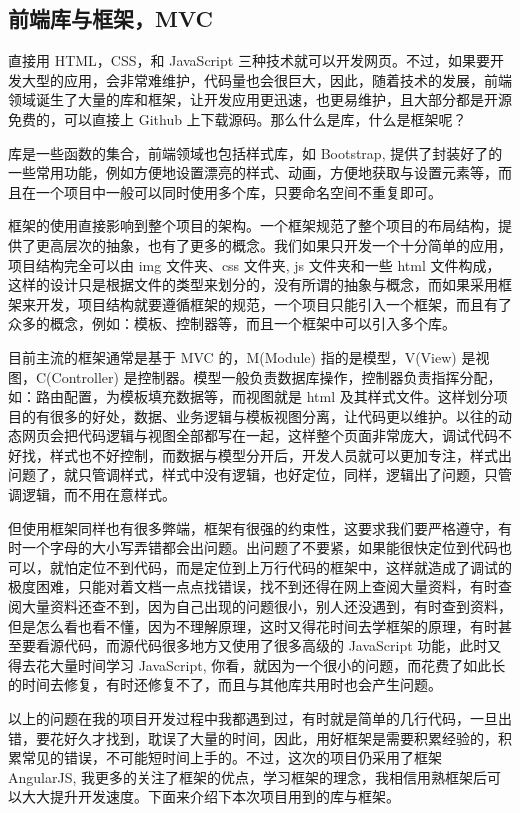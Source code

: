         \subsection{前端库与框架，MVC}
          \label{subsec:前端库与框架}
            直接用 HTML，CSS，和 JavaScript 三种技术就可以开发网页。不过，如果要开发大型的应用，会非常难维护，代码量也会很巨大，因此，随着技术的发展，前端领域诞生了大量的库和框架，让开发应用更迅速，也更易维护，且大部分都是开源免费的，可以直接上 Github 上下载源码。那么什么是库，什么是框架呢？
            \par
            库是一些函数的集合，前端领域也包括样式库，如 Bootstrap, 提供了封装好了的一些常用功能，例如方便地设置漂亮的样式、动画，方便地获取与设置元素等，而且在一个项目中一般可以同时使用多个库，只要命名空间不重复即可。
            \par
            框架的使用直接影响到整个项目的架构。一个框架规范了整个项目的布局结构，提供了更高层次的抽象，也有了更多的概念。我们如果只开发一个十分简单的应用，项目结构完全可以由 img 文件夹、css 文件夹, js 文件夹和一些 html 文件构成，这样的设计只是根据文件的类型来划分的，没有所谓的抽象与概念，而如果采用框架来开发，项目结构就要遵循框架的规范，一个项目只能引入一个框架，而且有了众多的概念，例如：模板、控制器等，而且一个框架中可以引入多个库。
            \par
            目前主流的框架通常是基于 MVC 的，M(Module) 指的是模型，V(View) 是视图，C(Controller) 是控制器。模型一般负责数据库操作，控制器负责指挥分配，如：路由配置，为模板填充数据等，而视图就是 html 及其样式文件。这样划分项目的有很多的好处，数据、业务逻辑与模板视图分离，让代码更以维护。以往的动态网页会把代码逻辑与视图全部都写在一起，这样整个页面非常庞大，调试代码不好找，样式也不好控制，而数据与模型分开后，开发人员就可以更加专注，样式出问题了，就只管调样式，样式中没有逻辑，也好定位，同样，逻辑出了问题，只管调逻辑，而不用在意样式。
            \par
            但使用框架同样也有很多弊端，框架有很强的约束性，这要求我们要严格遵守，有时一个字母的大小写弄错都会出问题。出问题了不要紧，如果能很快定位到代码也可以，就怕定位不到代码，而是定位到上万行代码的框架中，这样就造成了调试的极度困难，只能对着文档一点点找错误，找不到还得在网上查阅大量资料，有时查阅大量资料还查不到，因为自己出现的问题很小，别人还没遇到，有时查到资料，但是怎么看也看不懂，因为不理解原理，这时又得花时间去学框架的原理，有时甚至要看源代码，而源代码很多地方又使用了很多高级的 JavaScript 功能，此时又得去花大量时间学习 JavaScript, 你看，就因为一个很小的问题，而花费了如此长的时间去修复，有时还修复不了，而且与其他库共用时也会产生问题。
            \par
            以上的问题在我的项目开发过程中我都遇到过，有时就是简单的几行代码，一旦出错，要花好久才找到，耽误了大量的时间，因此，用好框架是需要积累经验的，积累常见的错误，不可能短时间上手的。不过，这次的项目仍采用了框架 AngularJS, 我更多的关注了框架的优点，学习框架的理念，我相信用熟框架后可以大大提升开发速度。下面来介绍下本次项目用到的库与框架。

